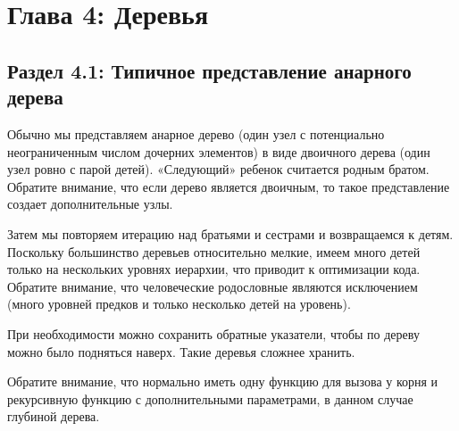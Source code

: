 \chapter*{Глава 4: Деревья}

\vspace{\baselineskip}
\section*{Раздел 4.1: Типичное представление анарного дерева}

\vspace{\baselineskip}
Обычно мы представляем анарное дерево (один узел с потенциально неограниченным числом дочерних элементов) в виде двоичного дерева (один узел ровно с парой детей). «Следующий» ребенок считается родным братом. Обратите внимание, что если дерево является двоичным, то такое представление создает дополнительные узлы.

\vspace{\baselineskip}
Затем мы повторяем итерацию над братьями и сестрами и возвращаемся к детям. Поскольку большинство деревьев относительно мелкие, имеем много детей только на нескольких уровнях иерархии, что приводит к оптимизации кода. Обратите внимание, что человеческие родословные являются исключением (много уровней предков и только несколько детей на уровень).

\vspace{\baselineskip}
При необходимости можно сохранить обратные указатели, чтобы по дереву можно было подняться наверх. Такие деревья сложнее хранить.

\vspace{\baselineskip}
Обратите внимание, что нормально иметь одну функцию для вызова у корня и рекурсивную функцию с дополнительными параметрами, в данном случае глубиной дерева.

